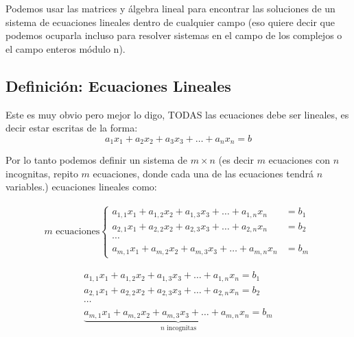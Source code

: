 \documentclass[12pt, fleqn]{report}                             %
\theoremstyle{break}                                            %
\begin{document}
            Podemos usar las matrices y álgebra lineal para encontrar las soluciones
            de un sistema de ecuaciones lineales dentro de cualquier campo (eso quiere
            decir que podemos ocuparla incluso para resolver sistemas en el campo de
            los complejos o el campo enteros módulo n).

            \subsection{Definición: Ecuaciones Lineales}

                Este es muy obvio pero mejor lo digo, TODAS las ecuaciones debe ser lineales,
                es decir estar escritas de la forma:
                \begin{equation*}
                    a_1x_1 + a_2x_2 + a_3x_3 + \dots + a_nx_n = b
                \end{equation*}

                Por lo tanto podemos definir un sistema de $m \times n$ (es decir $m$ ecuaciones
                con $n$ incognitas, repito $m$ ecuaciones, donde cada una de las ecuaciones tendrá
                $n$ variables.) ecuaciones lineales como:

                \begin{align*}
                    m \text{ ecuaciones}
                    \begin{cases}
                        a_{1,1}x_1 + a_{1,2}x_2 + a_{1,3}x_3 + \dots + a_{1,n}x_n &= b_1  \\
                        a_{2,1}x_1 + a_{2,2}x_2 + a_{2,3}x_3 + \dots + a_{2,n}x_n &= b_2  \\
                        \cdots                                                            \\
                        a_{m,1}x_1 + a_{m,2}x_2 + a_{m,3}x_3 + \dots + a_{m,n}x_n &= b_m  
                    \end{cases}      
                \end{align*}

                \begin{align*}
                    a_{1,1}x_1 + a_{1,2}x_2 + a_{1,3}x_3 + \dots + a_{1,n}x_n = b_1    \\
                    a_{2,1}x_1 + a_{2,2}x_2 + a_{2,3}x_3 + \dots + a_{2,n}x_n = b_2    \\
                    \cdots                                                             \\
                    \underbrace{a_{m,1}x_1 + a_{m,2}x_2 + a_{m,3}x_3 + \dots + a_{m,n}x_n = b_m}_\text{$n$ incognitas}
                \end{align*}
\end{document}

